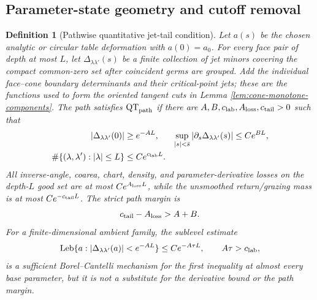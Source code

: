 \documentclass[11pt]{article}
\newtheorem{definition}[theorem]{Definition}
\begin{document}
\subsection{Parameter-state geometry and cutoff removal}
\label{sec:parameter-state}

\begin{definition}[Pathwise quantitative jet-tail condition]
\label{def:quantitative-circular-jets}
Let $a(s)$ be the chosen analytic or circular table deformation with
$a(0)=a_0$.  For every face pair of depth at most $L$, let
$\Delta_{\lambda\lambda'}(s)$ be a finite collection of jet minors covering
the compact common-zero set after coincident germs are grouped.  Add the
individual face--cone boundary determinants and their critical-point jets;
these are the functions used to form the oriented tangent cuts in Lemma
\ref{lem:cone-monotone-components}.  The path
satisfies $\mathrm{QT}_{\rm path}$ if there are
$A,B,c_{\rm lab},A_{\rm loss},c_{\rm tail}>0$ such that
\begin{align}
 |\Delta_{\lambda\lambda'}(0)|&\ge e^{-AL},
 &\sup_{|s|<\bar s}|\partial_s\Delta_{\lambda\lambda'}(s)|&\le Ce^{BL},
 \label{eq:pathwise-minor-bounds}\\
 \#\{(\lambda,\lambda'):|\lambda|\le L\}&\le Ce^{c_{\rm lab}L}.
 \label{eq:pathwise-label-count}
\end{align}
All inverse-angle, coarea, chart, density, and parameter-derivative losses on
the depth-$L$ good set are at most $Ce^{A_{\rm loss}L}$, while the unsmoothed
return/grazing mass is at most $Ce^{-c_{\rm tail}L}$.  The strict path margin
is
\begin{equation}
\label{eq:strict-jet-tail-margin}
 c_{\rm tail}-A_{\rm loss}>A+B.
\end{equation}
For a finite-dimensional ambient family, the sublevel estimate
\[
 \operatorname{Leb}\{a:|\Delta_{\lambda\lambda'}(a)|<e^{-AL}\}
 \le Ce^{-A\tau L},\qquad A\tau>c_{\rm lab},
\]
is a sufficient Borel--Cantelli mechanism for the first inequality at almost
every base parameter, but it is not a substitute for the derivative bound or
the path margin.
\end{definition}
\end{document}
